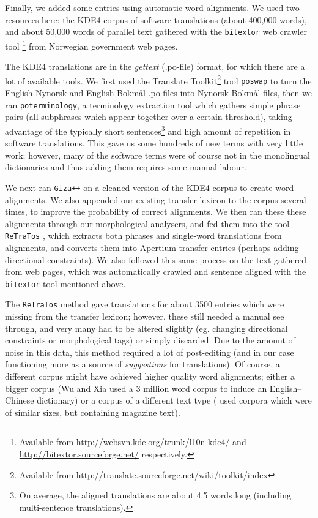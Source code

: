 \documentclass[11pt]{article}
\begin{document}
Finally, we added some entries using automatic word alignments. We
used two resources here: the KDE4 corpus of software translations
(about 400,000 words), and about 50,000 words of parallel text
gathered with the {\tt bitextor} web crawler tool
\citep{espla-gomis2009bfs}\footnote{Available
  from
  \href{http://websvn.kde.org/trunk/l10n-kde4/}{http://websvn.kde.org/trunk/l10n-kde4/}
  and
  \href{http://bitextor.sourceforge.net/}{http://bitextor.sourceforge.net/}
  respectively.} from Norwegian government web pages.

The KDE4 translations are in the \emph{gettext} (.po-file) format, for
which there are a lot of available tools. We first used the Translate
Toolkit\footnote{Available from
  \href{http://translate.sourceforge.net/wiki/toolkit/index}{http://translate.sourceforge.net/wiki/toolkit/index}
} tool {\tt poswap} to turn the English-Nynorsk and English-Bokmål
.po-files into Nynorsk-Bokmål files, then we ran
{\tt poterminology}, a terminology extraction tool which gathers
simple phrase pairs (all subphrases which appear together over a
certain threshold), taking advantage of the typically short
sentences\footnote{On average, the aligned translations are about 4.5
  words long (including multi-sentence translations).} and high amount
of repetition in software translations. This gave us some hundreds of
new terms with very little work; however, many of the software terms
were of course not in the monolingual dictionaries and thus adding
them requires some manual labour.

We next ran {\tt Giza++} \citep{och2003scv} on a cleaned version of the KDE4
corpus to create word alignments. We also appended our existing
transfer lexicon to the corpus several times, to improve the
probability of correct alignments. We then ran these these alignments
through our morphological analysers, and fed them into the tool
{\tt ReTraTos} \citep{caseli2006aib}, which extracts both phrases and
single-word translations from alignments, and converts them into
Apertium transfer entries (perhaps adding directional constraints). We
also followed this same process on the text gathered from web pages,
which was automatically crawled and sentence aligned with the {\tt bitextor}
tool mentioned above.

The {\tt ReTraTos} method gave translations for about 3500 entries which
were missing from the transfer lexicon; however, these still needed a
manual see through, and very many had to be altered slightly (eg.
changing directional constraints or morphological tags) or simply
discarded. Due to the amount of noise in this data, this method
required a lot of post-editing (and in our case functioning more as a
source of \emph{suggestions} for translations). Of course, a different
corpus might have achieved higher quality word alignments; either a
bigger corpus (Wu and Xia \citep[1994, in][p.~230]{caseli2006aib} used
a 3 million word corpus to induce an English–Chinese dictionary) or a
corpus of a different text type (\citet{caseli2006aib} used corpora
which were of similar sizes, but containing magazine text).
\end{document}
